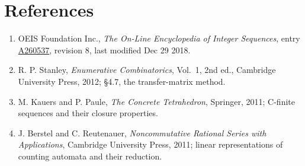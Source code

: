 \documentclass[11pt]{article}
\theoremstyle{definition}
\begin{document}
\section{References}

\begin{enumerate}

\item OEIS Foundation Inc., \emph{The On-Line Encyclopedia of Integer Sequences}, entry \href{https://oeis.org/A260537}{A260537}, revision 8, last modified Dec 29 2018.

\item R. P. Stanley, \emph{Enumerative Combinatorics}, Vol.~1, 2nd ed., Cambridge University Press, 2012; \S4.7, the transfer-matrix method.

\item M. Kauers and P. Paule, \emph{The Concrete Tetrahedron}, Springer, 2011; C-finite sequences and their closure properties.

\item J. Berstel and C. Reutenauer, \emph{Noncommutative Rational Series with Applications}, Cambridge University Press, 2011; linear representations of counting automata and their reduction.

\end{enumerate}
\end{document}
